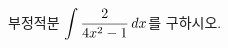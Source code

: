 \hspace*{2mm}\begin{minipage}[t]{\dimexpr\linewidth-2mm\relax}\vspace{0pt}
부정적분 $\displaystyle\int\dfrac{2}{4x^2-1}\mkern3mu dx$를 구하시오.\end{minipage}
